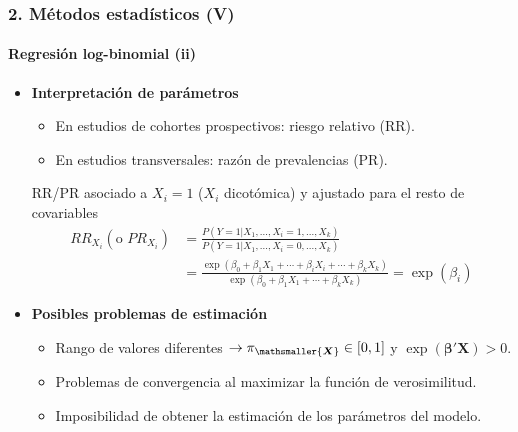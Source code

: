 \documentclass{beamer}
\begin{document}
\begin{frame}
\frametitle{2. Métodos estadísticos (V)}
\framesubtitle{Regresión log-binomial (ii)}
	\begin{itemize}\itemsep5pt
		\item \textbf{Interpretación de parámetros}
			\begin{itemize}\itemsep4pt
				\item En estudios de cohortes prospectivos: {\color{green!55!blue} riesgo relativo} (RR).
				\item En estudios transversales: {\color{green!55!blue} razón de prevalencias} (PR).
			\end{itemize}
		
			\begin{block}{\small RR/PR asociado a $X_i=1$ ($X_i$ dicotómica) y ajustado para el resto de covariables}
			\small
			\vspace{-0.45cm}
			\begin{align*}
			RR_{X_i} (\text{o } PR_{X_i} )
			&= \frac{P(Y=1|X_1,...  ,X_i=1,... , X_k)}{P(Y=1|X_1, ... ,X_i=0, ..., X_k)} \\[1.2ex]
			&= \frac{\exp(\beta_0 + \beta_1X_1 + \cdots + \beta_iX_i + \cdots + \beta_kX_k)}{\exp(\beta_0 +\beta_1X_1+ \cdots + \beta_kX_k)}  = \exp(\beta_i)
			\end{align*}
			\normalsize
		\end{block}
		\vspace{0.1cm}
		\item \textbf{Posibles problemas de estimación}
			\begin{itemize}\itemsep4pt
				\item Rango de valores diferentes $  \rightarrow \pi_{\mathsmaller{\boldsymbol{X}}} \in [0,1] $ y $\exp(\boldsymbol{\beta'X}) > 0$. 
				\item Problemas de convergencia al maximizar la función de verosimilitud.
				\item Imposibilidad de obtener la estimación de los parámetros del modelo.
		\end{itemize}
		
	\end{itemize}
\end{frame}
\end{document}

